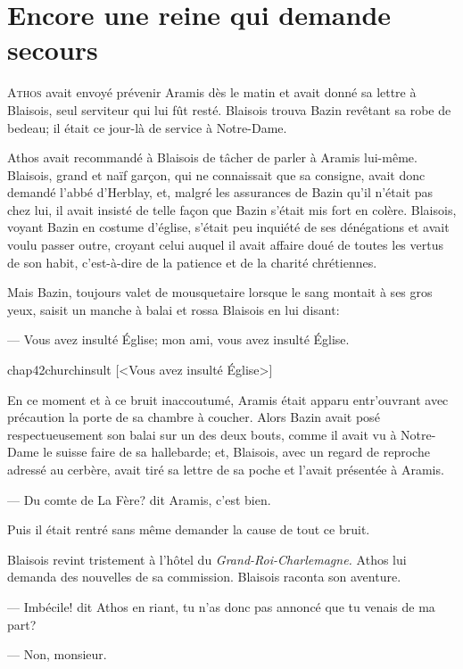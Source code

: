 \chapter{Encore une reine qui demande secours}

\lettrine{A}{thos} avait envoyé prévenir Aramis dès le matin et avait donné sa lettre à Blaisois, seul serviteur qui lui fût resté. Blaisois trouva Bazin revêtant sa robe de bedeau; il était ce jour-là de service à Notre-Dame.

\zz
Athos avait recommandé à Blaisois de tâcher de parler à Aramis lui-même. Blaisois, grand et naïf garçon, qui ne connaissait que sa consigne, avait donc demandé l'abbé d'Herblay, et, malgré les assurances de Bazin qu'il n'était pas chez lui, il avait insisté de telle façon que Bazin s'était mis fort en colère. Blaisois, voyant Bazin en costume d'église, s'était peu inquiété de ses dénégations et avait voulu passer outre, croyant celui auquel il avait affaire doué de toutes les vertus de son habit, c'est-à-dire de la patience et de la charité chrétiennes.

Mais Bazin, toujours valet de mousquetaire lorsque le sang montait à ses gros yeux, saisit un manche à balai et rossa Blaisois en lui disant:

— Vous avez insulté Église; mon ami, vous avez insulté Église.

\begin{bwbigpic}
	[\basicscale] 
	{chap42churchinsult}
	[<Vous avez insulté Église>]
\end{bwbigpic}

En ce moment et à ce bruit inaccoutumé, Aramis était apparu entr'ouvrant avec précaution la porte de sa chambre à coucher. Alors Bazin avait posé respectueusement son balai sur un des deux bouts, comme il avait vu à Notre-Dame le suisse faire de sa hallebarde; et, Blaisois, avec un regard de reproche adressé au cerbère, avait tiré sa lettre de sa poche et l'avait présentée à Aramis.

— Du comte de La Fère? dit Aramis, c'est bien.

Puis il était rentré sans même demander la cause de tout ce bruit.

Blaisois revint tristement à l'hôtel du \textit{Grand-Roi-Charlemagne.} Athos lui demanda des nouvelles de sa commission. Blaisois raconta son aventure.

— Imbécile! dit Athos en riant, tu n'as donc pas annoncé que tu venais de ma part?

— Non, monsieur.

